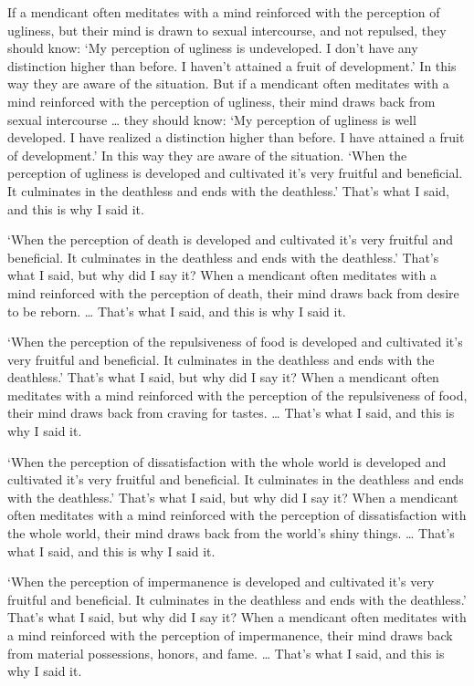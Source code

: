 \documentclass[12pt,openany]{book}%
\begin{document}
If a mendicant often meditates with a mind reinforced with the perception of ugliness, but their mind is drawn to sexual intercourse, and not repulsed, they should know: ‘My perception of ugliness is undeveloped. I don’t have any distinction higher than before. I haven’t attained a fruit of development.’ In this way they are aware of the situation. But if a mendicant often meditates with a mind reinforced with the perception of ugliness, their mind draws back from sexual intercourse … they should know: ‘My perception of ugliness is well developed. I have realized a distinction higher than before. I have attained a fruit of development.’ In this way they are aware of the situation. ‘When the perception of ugliness is developed and cultivated it’s very fruitful and beneficial. It culminates in the deathless and ends with the deathless.’ That’s what I said, and this is why I said it. 

‘When the perception of death is developed and cultivated it’s very fruitful and beneficial. It culminates in the deathless and ends with the deathless.’ That’s what I said, but why did I say it? When a mendicant often meditates with a mind reinforced with the perception of death, their mind draws back from desire to be reborn. … That’s what I said, and this is why I said it. 

‘When the perception of the repulsiveness of food is developed and cultivated it’s very fruitful and beneficial. It culminates in the deathless and ends with the deathless.’ That’s what I said, but why did I say it? When a mendicant often meditates with a mind reinforced with the perception of the repulsiveness of food, their mind draws back from craving for tastes. … That’s what I said, and this is why I said it. 

‘When the perception of dissatisfaction with the whole world is developed and cultivated it’s very fruitful and beneficial. It culminates in the deathless and ends with the deathless.’ That’s what I said, but why did I say it? When a mendicant often meditates with a mind reinforced with the perception of dissatisfaction with the whole world, their mind draws back from the world’s shiny things. … That’s what I said, and this is why I said it. 

‘When the perception of impermanence is developed and cultivated it’s very fruitful and beneficial. It culminates in the deathless and ends with the deathless.’ That’s what I said, but why did I say it? When a mendicant often meditates with a mind reinforced with the perception of impermanence, their mind draws back from material possessions, honors, and fame. … That’s what I said, and this is why I said it. 
\end{document}
